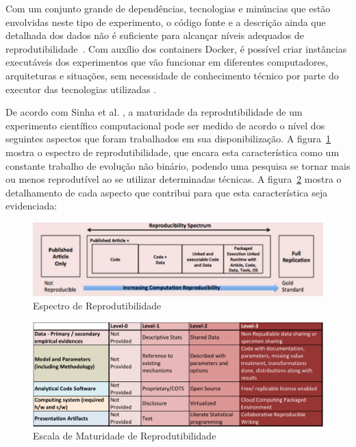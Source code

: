 \documentclass[a4paper,12pt]{monografia}
\theoremstyle{plain}
\theoremstyle{definition}
\theoremstyle{remark}
\begin{document}
Com um conjunto grande de dependências, tecnologias e minúncias que estão envolvidas neste tipo de experimento, o código fonte e a descrição ainda que detalhada dos dados não é suficiente para alcançar níveis adequados de reprodutibilidade~\cite{ince2012}. Com auxílio dos containers Docker, é possível criar instâncias executáveis dos experimentos que vão funcionar em diferentes computadores, arquiteturas e situações, sem necessidade de conhecimento técnico por parte do executor das tecnologias utilizadas \cite{boettiger2015}.

De acordo com Sinha et al. \cite{sinha2016}, a maturidade da reprodutibilidade de um experimento científico computacional pode ser medido de acordo o nível dos seguintes aspectos que foram trabalhados em sua disponibilização. A figura~\ref{fig:espectro_reprodutibilidade} mostra o espectro de reprodutibilidade, que encara esta característica como um constante trabalho de evolução não binário, podendo uma pesquisa se tornar mais ou menos reprodutível ao se utilizar determinadas técnicas. A figura~\ref{fig:escala_reprodutibilidade} mostra o detalhamento de cada aspecto que contribui para que esta característica seja evidenciada:

\begin{figure}[!htbp]
 \includegraphics[width=\textwidth]{espectro_reprodutibilidade}
 \caption{Espectro de Reprodutibilidade}\label{fig:espectro_reprodutibilidade}
\end{figure}

\begin{figure}[!htbp]
 \includegraphics[width=\textwidth]{escala_reprodutibilidade}
 \caption{Escala de Maturidade de Reprodutibilidade}\label{fig:escala_reprodutibilidade}
\end{figure}
\end{document}
